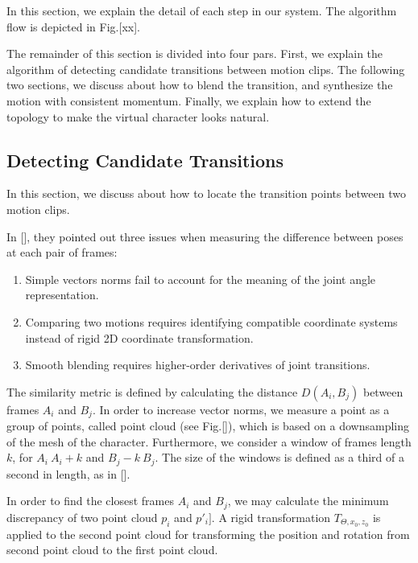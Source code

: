 In this section, we explain the detail of each step in our system. The algorithm 
flow is depicted in Fig.[xx]. 


The remainder of this section is divided into four pars. 
First, we explain the algorithm of detecting candidate transitions between 
motion clips. The following two sections, we discuss about how to blend the 
transition, and synthesize the motion with consistent momentum.
Finally, we explain how to extend the topology to make the virtual character 
looks natural.


\subsection{Detecting Candidate Transitions}
In this section, we discuss about how to locate the transition points between two 
motion clips. 

In [], they pointed out three issues when measuring the difference between poses at each pair of 
frames: 
\begin{enumerate}
\item Simple vectors norms fail to account for the meaning of the joint angle 
representation.
\item Comparing two motions requires identifying compatible coordinate systems 
instead of rigid 2D coordinate transformation.
\item Smooth blending requires higher-order derivatives of joint transitions.
\end{enumerate}


The similarity metric is defined by calculating the distance $D(A_i,B_j)$ 
between frames $A_i$ and $B_j$. In order to increase vector norms, we measure a 
point as a group of points, called point cloud (see Fig.[]), which is  based on a downsampling of the mesh of the character. 
Furthermore, we consider a window of frames length $k$, for $A_i ~ A_i+k$ and $B_j-k ~ 
B_j$. The size of the windows is defined as a third of a second in length, as in 
[]. 

In order to find the closest frames $A_i$ and $B_j$, we may calculate the 
minimum discrepancy of two point cloud $p_i$ and $p'_i]$. A rigid transformation $T_{\Theta,x_0,z_0}$
is applied to the second point cloud for transforming the position and rotation 
from second point cloud to the first point cloud.

